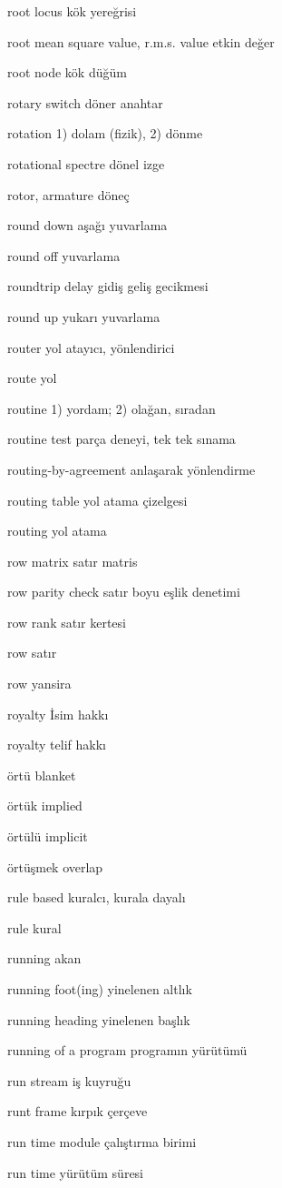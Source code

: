 \documentclass[12pt,fleqn]{article}\usepackage{../../common}
\begin{document}
root locus kök yereğrisi

root mean square value, r.m.s. value etkin değer

root node kök düğüm

rotary switch döner anahtar

rotation 1) dolam (fizik), 2) dönme

rotational spectre dönel izge

rotor, armature döneç

round down aşağı yuvarlama

round off yuvarlama

roundtrip delay gidiş geliş gecikmesi

round up yukarı yuvarlama

router yol atayıcı, yönlendirici

route yol

routine 1) yordam; 2) olağan, sıradan

routine test parça deneyi, tek tek sınama

routing-by-agreement anlaşarak yönlendirme

routing table yol atama çizelgesi

routing yol atama

row matrix satır matris

row parity check satır boyu eşlik denetimi

row rank satır kertesi

row satır

row yansira

royalty İsim hakkı

royalty telif hakkı

örtü blanket

örtük implied

örtülü implicit

örtüşmek overlap

rule based kuralcı, kurala dayalı

rule kural

running akan

running foot(ing) yinelenen altlık

running heading yinelenen başlık

running of a program programın yürütümü

run stream iş kuyruğu

runt frame kırpık çerçeve

run time module çalıştırma birimi

run time yürütüm süresi
\end{document}
